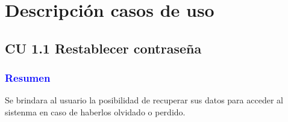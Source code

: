 \section{{Descripción casos de uso}}


\subsection{CU 1.1 Restablecer contraseña}

\subsubsection{\textcolor{blue}{Resumen}}
Se brindara al usuario la posibilidad de recuperar sus datos para acceder al sistenma en caso de haberlos olvidado o perdido.
